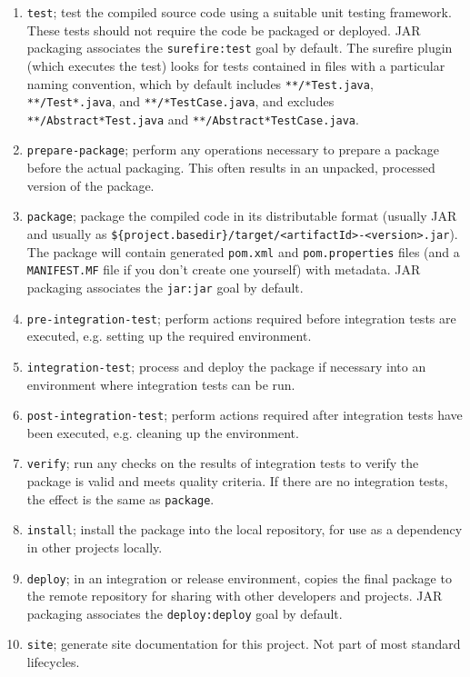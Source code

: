\documentclass[8pt, table, xcdraw]{article}%
\begin{document}
\begin{enumerate}
    \item \lstinline{test}; test the compiled source code using a suitable unit testing framework. These tests should not require the code be packaged or deployed. JAR packaging associates the \lstinline{surefire:test} goal by default. The surefire plugin (which executes the test) looks for tests contained in files with a particular naming convention, which by default includes \lstinline{**/*Test.java}, \lstinline{**/Test*.java}, and \lstinline{**/*TestCase.java}, and excludes \lstinline{**/Abstract*Test.java} and \lstinline{**/Abstract*TestCase.java}.
    \item \lstinline{prepare-package}; perform any operations necessary to prepare a package before the actual packaging. This often results in an unpacked, processed version of the package.
    \item \lstinline{package}; package the compiled code in its distributable format (usually JAR and usually as \lstinline|${project.basedir}/target/<artifactId>-<version>.jar|). The package will contain generated \lstinline{pom.xml} and \lstinline{pom.properties} files (and a \lstinline{MANIFEST.MF} file if you don't create one yourself) with metadata. JAR packaging associates the \lstinline{jar:jar} goal by default.
    \item \lstinline{pre-integration-test}; perform actions required before integration tests are executed, e.g. setting up the required environment.
    \item \lstinline{integration-test}; process and deploy the package if necessary into an environment where integration tests can be run.
    \item \lstinline{post-integration-test}; perform actions required after integration tests have been executed, e.g. cleaning up the environment.
    \item \lstinline{verify}; run any checks on the results of integration tests to verify the package is valid and meets quality criteria. If there are no integration tests, the effect is the same as \lstinline{package}.
    \item \lstinline{install}; install the package into the local repository, for use as a dependency in other projects locally.
    \item \lstinline{deploy}; in an integration or release environment, copies the final package to the remote repository for sharing with other developers and projects. JAR packaging associates the \lstinline{deploy:deploy} goal by default.
    \item \lstinline{site}; generate site documentation for this project. Not part of most standard lifecycles.
\end{enumerate}
\end{document}
